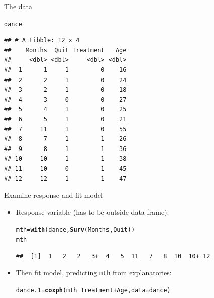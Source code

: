 \documentclass[unknownkeysallowed]{beamer}\usepackage[]{graphicx}\usepackage[]{color}
\makeatletter
\newcommand{\hlopt}[1]{\textcolor[rgb]{0,0,0}{#1}}%
\newcommand{\hlstd}[1]{\textcolor[rgb]{0.345,0.345,0.345}{#1}}%
\newcommand{\hlkwb}[1]{\textcolor[rgb]{0.69,0.353,0.396}{#1}}%
\newcommand{\hlkwc}[1]{\textcolor[rgb]{0.333,0.667,0.333}{#1}}%
\newcommand{\hlkwd}[1]{\textcolor[rgb]{0.737,0.353,0.396}{\textbf{#1}}}%
\newenvironment{kframe}{%
 \def\at@end@of@kframe{}%
 \ifinner\ifhmode%
  \def\at@end@of@kframe{\end{minipage}}%
  \begin{minipage}{\columnwidth}%
 \fi\fi%
 \def\FrameCommand##1{\hskip\@totalleftmargin \hskip-\fboxsep
 \colorbox{shadecolor}{##1}\hskip-\fboxsep
     \hskip-\linewidth \hskip-\@totalleftmargin \hskip\columnwidth}%
 \MakeFramed {\advance\hsize-\width
   \@totalleftmargin\z@ \linewidth\hsize
   \@setminipage}}%
 {\par\unskip\endMakeFramed%
 \at@end@of@kframe}
\newenvironment{knitrout}{}{} %
\makeatother
\begin{document}
\begin{frame}[fragile]{The data}
  
\begin{knitrout}\small
{}\color{fgcolor}\begin{kframe}
\begin{alltt}
\hlstd{dance}
\end{alltt}
\begin{verbatim}
## # A tibble: 12 x 4
##    Months  Quit Treatment   Age
##     <dbl> <dbl>     <dbl> <dbl>
##  1      1     1         0    16
##  2      2     1         0    24
##  3      2     1         0    18
##  4      3     0         0    27
##  5      4     1         0    25
##  6      5     1         0    21
##  7     11     1         0    55
##  8      7     1         1    26
##  9      8     1         1    36
## 10     10     1         1    38
## 11     10     0         1    45
## 12     12     1         1    47
\end{verbatim}
\end{kframe}
\end{knitrout}
  
\end{frame}

\begin{frame}[fragile]{Examine response and fit model}
  
  \begin{itemize}
  \item Response variable (has to be outside data frame):

\begin{knitrout}\footnotesize
{}\color{fgcolor}\begin{kframe}
\begin{alltt}
\hlstd{mth}\hlkwb{=}\hlkwd{with}\hlstd{(dance,}\hlkwd{Surv}\hlstd{(Months,Quit))}
\hlstd{mth}
\end{alltt}
\begin{verbatim}
##  [1]  1   2   2   3+  4   5  11   7   8  10  10+ 12
\end{verbatim}
\end{kframe}
\end{knitrout}

  \item Then fit model, predicting \texttt{mth} from explanatories:

 
\begin{knitrout}
\color{fgcolor}\begin{kframe}
\begin{alltt}
\hlstd{dance.1}\hlkwb{=}\hlkwd{coxph}\hlstd{(mth}\hlopt{~}\hlstd{Treatment}\hlopt{+}\hlstd{Age,}\hlkwc{data}\hlstd{=dance)}
\end{alltt}
\end{kframe}
\end{knitrout}

  \end{itemize}
  
\end{frame}
\end{document}
